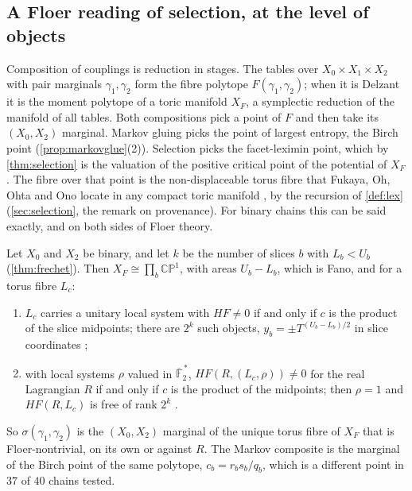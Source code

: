 \documentclass[11pt]{article}
\theoremstyle{definition}\newtheorem{definition}[theorem]{Definition}\newtheorem{remark}[theorem]{Remark}\newtheorem{example}[theorem]{Example}\newtheorem{problem}[theorem]{Open problem}\crefname{problem}{Problem}{Problems}
\begin{document}
\subsection{A Floer reading of selection, at the level of objects}\label{sec:selfloer}
Composition of couplings is reduction in stages. The tables over $X_0\times X_1\times X_2$ with pair marginals $\gamma_1,\gamma_2$ form the fibre polytope $F(\gamma_1,\gamma_2)$; when it is Delzant it is the moment
polytope of a toric manifold $X_F$, a symplectic reduction of the manifold of all tables. Both compositions pick a point of $F$ and then take its $(X_0,X_2)$ marginal. Markov gluing picks the point of
largest entropy, the Birch point (\cref{prop:markovglue}(2)). Selection picks the facet-leximin point, which by \cref{thm:selection} is the valuation of the positive critical point of the potential of $X_F$. The
fibre over that point is the non-displaceable torus fibre that Fukaya, Oh, Ohta and Ono locate in any compact toric manifold \cite[Theorem~1.5 and \S9]{FOOO2010}, by the recursion of \cref{def:lex}
(\cref{sec:selection}, the remark on provenance). For binary chains this can be said exactly, and on both sides of Floer theory.

\begin{proposition}\label{prop:selfloer}
Let $X_0$ and $X_2$ be binary, and let $k$ be the number of slices $b$ with $L_b<U_b$ (\cref{thm:frechet}). Then $X_F\cong\prod_b\mathbb{CP}^1$, with areas $U_b-L_b$, which is Fano, and for a torus fibre $L_c$:
\begin{enumerate}
\item[(1)] $L_c$ carries a unitary local system with $HF\ne0$ if and only if $c$ is the product of the slice midpoints; there are $2^k$ such objects, $y_b=\pm T^{(U_b-L_b)/2}$ in slice coordinates \cite{ChoOh2006};
\item[(2)] with local systems $\rho$ valued in $\overline{\mathbb F}_2^{\,*}$, $HF(R,(L_c,\rho))\ne0$ for the real Lagrangian $R$ if and only if $c$ is the product of the midpoints; then $\rho=1$ and $HF(R,L_c)$ is free of
rank $2^k$ \cite[Theorems~1.2 and 4.3]{AlstonAmorim2010}.
\end{enumerate}
So $\sigma(\gamma_1,\gamma_2)$ is the $(X_0,X_2)$ marginal of the unique torus fibre of $X_F$ that is Floer-nontrivial, on its own or against $R$. The Markov composite is the marginal of the Birch point of the
same polytope, $c_b=r_bs_b/q_b$, which is a different point in $37$ of $40$ chains tested.
\end{proposition}
\end{document}
